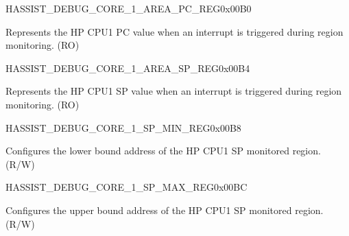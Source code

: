 \begin{register}{H}{ASSIST\_DEBUG\_CORE\_1\_AREA\_PC\_REG}{0x00B0}\label{regdesc:ASSISTDEBUGCORE1AREAPCREG}
%
\regnewline%
\begin{regdesc}\begin{reglist}
\label{fielddesc:ASSISTDEBUGCORE1AREAPC}\item [ASSIST\_DEBUG\_CORE\_1\_AREA\_PC] Represents the HP CPU1 PC value when an interrupt is triggered during region monitoring. (RO)
\end{reglist}\end{regdesc}
\end{register}


\begin{register}{H}{ASSIST\_DEBUG\_CORE\_1\_AREA\_SP\_REG}{0x00B4}\label{regdesc:ASSISTDEBUGCORE1AREASPREG}
%
\regnewline%
\begin{regdesc}\begin{reglist}
\label{fielddesc:ASSISTDEBUGCORE1AREASP}\item [ASSIST\_DEBUG\_CORE\_1\_AREA\_SP] Represents the HP CPU1 SP value when an interrupt is triggered during region monitoring. (RO)
\end{reglist}\end{regdesc}
\end{register}


\begin{register}{H}{ASSIST\_DEBUG\_CORE\_1\_SP\_MIN\_REG}{0x00B8}\label{regdesc:ASSISTDEBUGCORE1SPMINREG}
%
\regnewline%
\begin{regdesc}\begin{reglist}
\label{fielddesc:ASSISTDEBUGCORE1SPMIN}\item [ASSIST\_DEBUG\_CORE\_1\_SP\_MIN] Configures the lower bound address of the HP CPU1 SP monitored region. (R/W)
\end{reglist}\end{regdesc}
\end{register}


\begin{register}{H}{ASSIST\_DEBUG\_CORE\_1\_SP\_MAX\_REG}{0x00BC}\label{regdesc:ASSISTDEBUGCORE1SPMAXREG}
%
\regnewline%
\begin{regdesc}\begin{reglist}
\label{fielddesc:ASSISTDEBUGCORE1SPMAX}\item [ASSIST\_DEBUG\_CORE\_1\_SP\_MAX] Configures the upper bound address of the HP CPU1 SP monitored region. (R/W)
\end{reglist}\end{regdesc}
\end{register}


